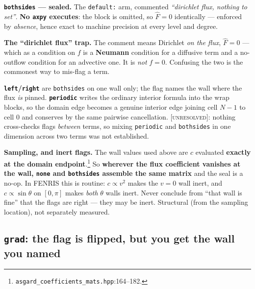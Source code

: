 \documentclass[10pt]{article}
\newcommand{\code}[1]{\texttt{#1}}
\newcommand{\hF}{\widehat{F}}
\newcommand{\UNR}{\textcolor{red!60!black}{\textsc{[unresolved]}}}
\newcommand{\fl}[2]{\texttt{#1}:#2}
\begin{document}
\textbf{\code{bothsides} --- sealed.} The \code{default:} arm, commented
\emph{``dirichlet flux, nothing to set''}. \textbf{No \code{axpy} executes}: the
block is omitted, so $\hF=0$ identically --- enforced by \emph{absence}, hence
exact to machine precision at every level and degree.

\textbf{The ``dirichlet flux'' trap.} The comment means Dirichlet \emph{on the
flux}, $\hF=0$ --- which as a condition on $f$ is a \textbf{Neumann} condition
for a diffusive term and a no-outflow condition for an advective one. It is
\emph{not} $f=0$. Confusing the two is the commonest way to mis-flag a term.

\textbf{\code{left}/\code{right}} are \code{bothsides} on one wall only; the flag
names the wall where the flux \emph{is} pinned. \textbf{\code{periodic}} writes
the ordinary interior formula into the wrap blocks, so the domain edge becomes a
genuine interior edge joining cell $N{-}1$ to cell $0$ and conserves by the same
pairwise cancellation. \UNR{}: nothing cross-checks flags \emph{between} terms,
so mixing \code{periodic} and \code{bothsides} in one dimension across two terms
was not established.

\textbf{Sampling, and inert flags.} The wall values used above are $c$ evaluated
\textbf{exactly at the domain endpoint}.\footnote{\fl{asgard\_coefficients\_mats.hpp}{164--182}.}
So \textbf{wherever the flux coefficient vanishes at the wall, \code{none} and
\code{bothsides} assemble the same matrix} and the seal is a no-op. In FENRIS
this is routine: $c\propto v^2$ makes the $v=0$ wall inert, and
$c\propto\sin\theta$ on $[0,\pi]$ makes \emph{both} $\theta$ walls inert. Never
conclude from ``that wall is fine'' that the flags are right --- they may be
inert. Structural (from the sampling location), not separately measured.

\subsection{\code{grad}: the flag is flipped, but you get the wall you named}
\label{sec:gradflip}
\end{document}
